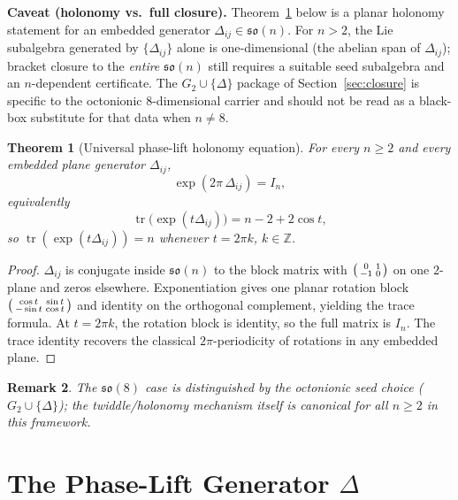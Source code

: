 \documentclass[11pt]{amsart}
\newtheorem{theorem}{Theorem}[section]
\newtheorem{remark}[theorem]{Remark}
\begin{document}
\medskip
\noindent\textbf{Caveat (holonomy vs.\ full closure).} Theorem~\ref{thm:universal-holonomy} below is a planar holonomy statement for an embedded generator \(\Delta_{ij}\in\mathfrak{so}(n)\). For \(n>2\), the Lie subalgebra generated by \(\{\Delta_{ij}\}\) alone is one-dimensional (the abelian span of \(\Delta_{ij}\)); bracket closure to the \emph{entire} \(\mathfrak{so}(n)\) still requires a suitable seed subalgebra and an \(n\)-dependent certificate. The \(G_2\cup\{\Delta\}\) package of Section~\ref{sec:closure} is specific to the octonionic \(8\)-dimensional carrier and should not be read as a black-box substitute for that data when \(n\neq 8\).

\begin{theorem}[Universal phase-lift holonomy equation]
\label{thm:universal-holonomy}
For every \(n\ge 2\) and every embedded plane generator \(\Delta_{ij}\),
\[
\exp(2\pi\,\Delta_{ij})=I_n,
\]
equivalently
\[
\operatorname{tr}\!\bigl(\exp(t\Delta_{ij})\bigr)=n-2+2\cos t,
\]
so \(\operatorname{tr}(\exp(t\Delta_{ij}))=n\) whenever \(t=2\pi k\), \(k\in\mathbb Z\).
\end{theorem}

\begin{proof}
\(\Delta_{ij}\) is conjugate inside \(\mathfrak{so}(n)\) to the block matrix with
\(\begin{psmallmatrix}0&1\\-1&0\end{psmallmatrix}\) on one \(2\)-plane and zeros elsewhere. Exponentiation gives one planar rotation block \(\begin{psmallmatrix}\cos t&\sin t\\-\sin t&\cos t\end{psmallmatrix}\) and identity on the orthogonal complement, yielding the trace formula. At \(t=2\pi k\), the rotation block is identity, so the full matrix is \(I_n\).
The trace identity recovers the classical \(2\pi\)-periodicity of rotations in any embedded plane.
\end{proof}

\begin{remark}
The \(\mathfrak{so}(8)\) case is distinguished by the octonionic seed choice (\(G_2\cup\{\Delta\}\)); the twiddle/holonomy mechanism itself is canonical for all \(n\ge 2\) in this framework.
\end{remark}

\section{The Phase-Lift Generator \texorpdfstring{$\Delta$}{Delta}}
\end{document}
